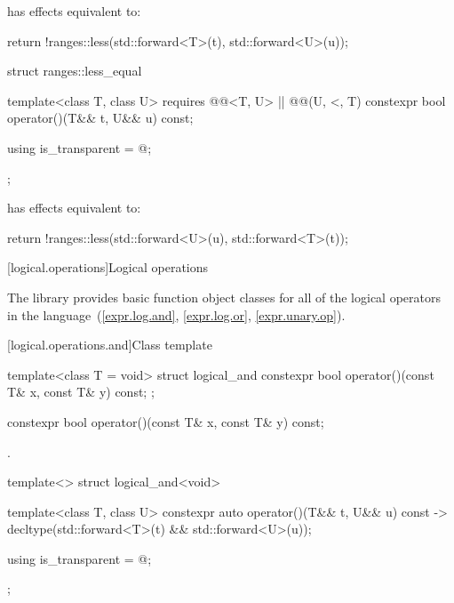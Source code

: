 \begin{itemdescr}
\pnum
{} has effects equivalent to:
\begin{codeblock}
return !ranges::less{}(std::forward<T>(t), std::forward<U>(u));
\end{codeblock}
\end{itemdescr}

%
\begin{itemdecl}
struct ranges::less_equal {
  template<class T, class U>
    requires @@<T, U> || @@(U, <, T)
  constexpr bool operator()(T&& t, U&& u) const;

  using is_transparent = @\unspecnc@;
};
\end{itemdecl}

\begin{itemdescr}
\pnum
{} has effects equivalent to:
\begin{codeblock}
return !ranges::less{}(std::forward<U>(u), std::forward<T>(t));
\end{codeblock}
\end{itemdescr}

[logical.operations]{Logical operations}

\pnum
The library provides basic function object classes for all of the logical
operators in the language~(\ref{expr.log.and}, \ref{expr.log.or}, \ref{expr.unary.op}).

[logical.operations.and]{Class template }

%
\begin{itemdecl}
template<class T = void> struct logical_and {
  constexpr bool operator()(const T& x, const T& y) const;
};
\end{itemdecl}

%
\begin{itemdecl}
constexpr bool operator()(const T& x, const T& y) const;
\end{itemdecl}

\begin{itemdescr}
\pnum
\returns
{}.
\end{itemdescr}

%
\begin{itemdecl}
template<> struct logical_and<void> {
  template<class T, class U> constexpr auto operator()(T&& t, U&& u) const
    -> decltype(std::forward<T>(t) && std::forward<U>(u));

  using is_transparent = @\unspec@;
};
\end{itemdecl}

